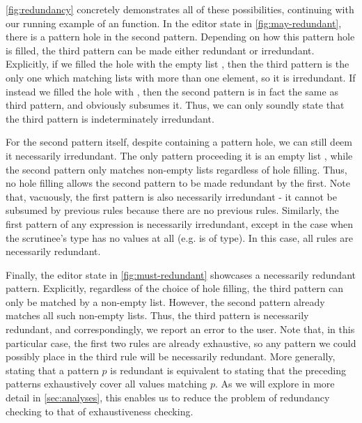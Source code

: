 \autoref{fig:redundancy} concretely demonstrates all of these possibilities, continuing with our running example of an  function. In the editor state in \autoref{fig:may-redundant}, there is a pattern hole in the second pattern. Depending on how this pattern hole is filled, the third pattern can be made either redundant or irredundant. Explicitly, if we filled the hole with the empty list \li{[]}, then the third pattern is the only one which matching lists with more than one element, so it is irredundant. If instead we filled the hole with , then the second pattern is in fact the same as third pattern, and obviously subsumes it. Thus, we can only soundly state that the third pattern is indeterminately irredundant.

For the second pattern itself, despite containing a pattern hole, we can still deem it necessarily irredundant. The only pattern proceeding it is an empty list \li{[]}, while the second pattern only matches non-empty lists regardless of hole filling. Thus, no hole filling allows the second pattern to be made redundant by the first. Note that, vacuously, the first pattern is also necessarily irredundant - it cannot be subsumed by previous rules because there are no previous rules. Similarly, the first pattern of any  expression is necessarily irredundant, except in the case when the scrutinee's type has no values at all (e.g. is of  type). In this case, all rules are necessarily redundant.

Finally, the editor state in \autoref{fig:must-redundant} showcases a necessarily redundant pattern. Explicitly, regardless of the choice of hole filling, the third pattern can only be matched by a non-empty list. However, the second pattern already matches all such non-empty lists. Thus, the third pattern is necessarily redundant, and correspondingly, we report an error to the user. Note that, in this particular case, the first two rules are already exhaustive, so any pattern we could possibly place in the third rule will be necessarily redundant. More generally, stating that a pattern $p$ is redundant is equivalent to stating that the preceding patterns exhaustively cover all values matching $p$. As we will explore in more detail in \autoref{sec:analyses}, this enables us to reduce the problem of redundancy checking to that of exhaustiveness checking.
